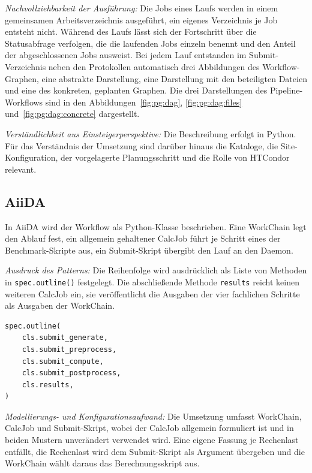 \emph{Nachvollziehbarkeit der Ausführung:} Die Jobs eines Laufs
werden in einem gemeinsamen Arbeitsverzeichnis ausgeführt, ein
eigenes Verzeichnis je Job entsteht nicht. Während des Laufs lässt
sich der Fortschritt über die Statusabfrage verfolgen, die die
laufenden Jobs einzeln benennt und den Anteil der abgeschlossenen
Jobs ausweist. Bei jedem Lauf entstanden
im Submit-Verzeichnis neben den Protokollen automatisch drei
Abbildungen des Workflow-Graphen, eine abstrakte Darstellung, eine
Darstellung mit den beteiligten Dateien und eine des konkreten,
geplanten Graphen. Die drei Darstellungen des
Pipeline-Workflows sind in den Abbildungen~\ref{fig:pg:dag},
\ref{fig:pg:dag:files} und~\ref{fig:pg:dag:concrete} dargestellt.

\emph{Verständlichkeit aus Einsteigerperspektive:} Die Beschreibung
erfolgt in Python. Für das Verständnis der Umsetzung sind darüber
hinaus die Kataloge, die Site-Konfiguration, der vorgelagerte
Planungsschritt und die Rolle von HTCondor relevant.

\subsection{AiiDA}
\label{sec:lokal:pipeline:aiida}

In AiiDA wird der Workflow als Python-Klasse beschrieben. Eine
WorkChain legt den Ablauf fest, ein allgemein gehaltener CalcJob
führt je Schritt eines der Benchmark-Skripte aus, ein Submit-Skript
übergibt den Lauf an den Daemon.

\emph{Ausdruck des Patterns:} Die Reihenfolge wird ausdrücklich als
Liste von Methoden in \texttt{spec.outline()} festgelegt. Die
abschließende Methode \texttt{results} reicht keinen weiteren
CalcJob ein, sie veröffentlicht die Ausgaben der vier fachlichen
Schritte als Ausgaben der WorkChain.

\begin{lstlisting}[language=Python,caption={Reihenfolge in spec.outline() (AiiDA, Pipeline)},label={lst:pipe:ai}]
spec.outline(
    cls.submit_generate,
    cls.submit_preprocess,
    cls.submit_compute,
    cls.submit_postprocess,
    cls.results,
)
\end{lstlisting}

\emph{Modellierungs- und Konfigurationsaufwand:} Die Umsetzung
umfasst WorkChain, CalcJob und Submit-Skript, wobei der CalcJob
allgemein formuliert ist und in beiden Mustern unverändert verwendet
wird. Eine eigene Fassung je Rechenlast entfällt, die Rechenlast wird
dem Submit-Skript als Argument übergeben und die WorkChain wählt
daraus das Berechnungsskript aus.

